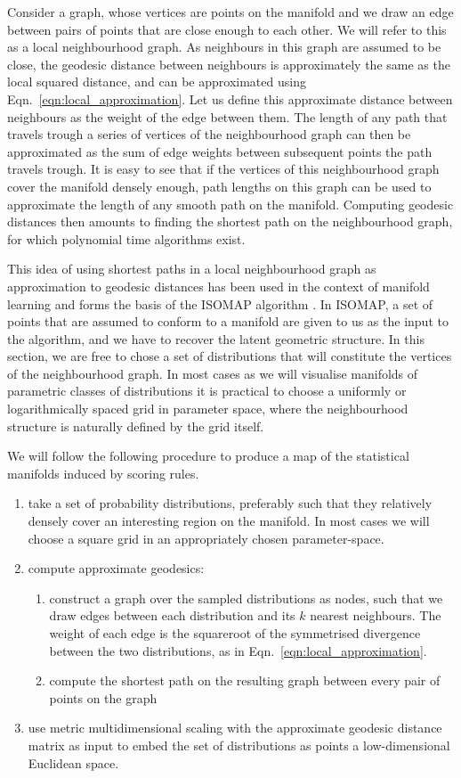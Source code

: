 Consider a graph, whose vertices are points on the manifold and we draw an edge between pairs of points that are close enough to each other. We will refer to this as a local neighbourhood graph. As neighbours in this graph are assumed to be close, the geodesic distance between neighbours is approximately the same as the local squared distance, and can be approximated using Eqn.\ \ref{eqn:local_approximation}. Let us define this approximate distance between neighbours as the weight of the edge between them. The length of any path that travels trough a series of vertices of the neighbourhood graph can then be approximated as the sum of edge weights between subsequent points the path travels trough. It is easy to see that if the vertices of this neighbourhood graph cover the manifold densely enough, path lengths on this graph can be used to approximate the length of any smooth path on the manifold. Computing geodesic distances then amounts to finding the shortest path on the neighbourhood graph, for which polynomial time algorithms exist.

This idea of using shortest paths in a local neighbourhood graph as approximation to geodesic distances has been used in the context of manifold learning and forms the basis of the ISOMAP algorithm \citep{Tenenbaum2000}. In ISOMAP, a set of points that are assumed to conform to a manifold are given to us as the input to the algorithm, and we have to recover the latent geometric structure. In this section, we are free to chose a set of distributions that will constitute the vertices of the neighbourhood graph. In most cases as we will visualise manifolds of parametric classes of distributions it is practical to choose a uniformly or logarithmically spaced grid in parameter space, where the neighbourhood structure is naturally defined by the grid itself.

We will follow the following procedure to produce a map of the statistical manifolds induced by scoring rules.

\begin{enumerate}
\item take a set of probability distributions, preferably such that they relatively densely cover an interesting region on the manifold. In most cases we will choose a square grid in an appropriately chosen parameter-space.
\item compute approximate geodesics:
\begin{enumerate}
	\item construct a graph over the sampled distributions as nodes, such that we draw edges between each distribution and its $k$ nearest neighbours. The weight of each edge is the squareroot of the symmetrised divergence between the two distributions, as in Eqn.\ \eqref{eqn:local_approximation}.
	\item compute the shortest path on the resulting graph between every pair of points on the graph
\end{enumerate}
\item use metric multidimensional scaling with the approximate geodesic distance matrix as input to embed the set of distributions as points a low-dimensional Euclidean space.
\end{enumerate}


